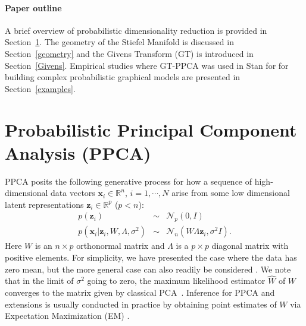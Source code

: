 \documentclass{article}
\newcommand{\mb}[1]{\mathbf{#1}}
\begin{document}
\paragraph{Paper outline} A brief overview of probabilistic dimensionality reduction is provided in Section~\ref{Probabilistic dimensionality reduction}. The geometry of the Stiefel Manifold is discussed in Section~\ref{geometry} and the Givens Transform (GT) is introduced in Section~\ref{Givens}. Empirical studies where GT-PPCA was used in Stan for for building complex probabilistic graphical models are presented in Section~\ref{examples}.


\section{Probabilistic Principal Component Analysis (PPCA)} \label{Probabilistic dimensionality reduction}

PPCA posits the following generative process for how a sequence of high-dimensional data vectors $\mathbf{x}_i \in \mathbb{R}^n$, $i = 1, \cdots, N$ arise from some low dimensional latent representations $\mathbf{z}_i \in \mathbb{R}^p$ ($p < n$):
\begin{eqnarray}
\label{eq:PpcaGenerativeProcess}
p(\mb{z}_i) &\sim& \mathcal{N}_p(0, I) \nonumber\\
p(\mb{x}_i | \mb{z}_i, W, \Lambda, \sigma^2) &\sim& \mathcal{N}_n(W \Lambda \mb{z}_i, \sigma^2 I).
\end{eqnarray}
Here $W$ is an $n \times p$ orthonormal matrix and $\Lambda$ is a $p \times p$ diagonal matrix with positive elements.  For simplicity, we have presented the case where the data has zero mean, but the more general case can also readily be considered \citep[chapt.~12.1]{murphy2012machine}. We note that in the limit of $\sigma^2$ going to zero, the maximum likelihood estimator $\hat{W}$ of $W$ converges to the matrix given by classical PCA~\citep{tipping1999probabilistic}. Inference for PPCA and extensions is usually conducted in practice by obtaining point estimates of $W$ via Expectation Maximization (EM) \citep[chapt.~12.2.5]{murphy2012machine}.
\end{document}
